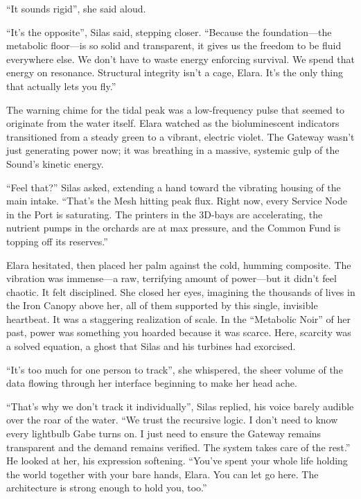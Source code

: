 ``It sounds rigid'', she said aloud.

``It's the opposite'', Silas said, stepping closer. ``Because the foundation—the metabolic floor—is so solid and transparent, it gives us the freedom to be fluid everywhere else. We don't have to waste energy enforcing survival. We spend that energy on resonance. Structural integrity isn't a cage, Elara. It's the only thing that actually lets you fly.''

The warning chime for the tidal peak was a low-frequency pulse that seemed to originate from the water itself. Elara watched as the bioluminescent indicators transitioned from a steady green to a vibrant, electric violet. The Gateway wasn't just generating power now; it was breathing in a massive, systemic gulp of the Sound's kinetic energy. 

``Feel that?'' Silas asked, extending a hand toward the vibrating housing of the main intake. ``That's the Mesh hitting peak flux. Right now, every Service Node in the Port is saturating. The printers in the 3D-bays are accelerating, the nutrient pumps in the orchards are at max pressure, and the Common Fund is topping off its reserves.''

Elara hesitated, then placed her palm against the cold, humming composite. The vibration was immense—a raw, terrifying amount of power—but it didn't feel chaotic. It felt disciplined. She closed her eyes, imagining the thousands of lives in the Iron Canopy above her, all of them supported by this single, invisible heartbeat. It was a staggering realization of scale. In the ``Metabolic Noir'' of her past, power was something you hoarded because it was scarce. Here, scarcity was a solved equation, a ghost that Silas and his turbines had exorcised.

``It's too much for one person to track'', she whispered, the sheer volume of the data flowing through her interface beginning to make her head ache.

``That's why we don't track it individually'', Silas replied, his voice barely audible over the roar of the water. ``We trust the recursive logic. I don't need to know every lightbulb Gabe turns on. I just need to ensure the Gateway remains transparent and the demand remains verified. The system takes care of the rest.'' He looked at her, his expression softening. ``You've spent your whole life holding the world together with your bare hands, Elara. You can let go here. The architecture is strong enough to hold you, too.''



